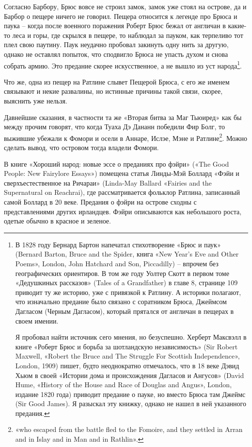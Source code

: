 Согласно Барбору, Брюс вовсе не строил замок, замок уже стоял на острове, да и Барбор о пещере ничего не говорил. Пещера относится к легенде про Брюса и паука – когда после военного поражения Роберт Брюс бежал от англичан в какие-то леса и горы, где скрылся в пещере, то наблюдал за пауком, как терпеливо тот плел свою паутину. Паук неудачно пробовал закинуть одну нить за другую, однако не оставлял попыток, что сподвигло Брюса не упасть духом и снова собрать армию. Это предание скорее искусственное, а не вышло из уст народа\footnote{В 1828 году Бернард Бартон напечатал стихотворение «Брюс и паук» (Bernard Barton, Bruce and the Spider, книга «New Year's Eve and Other Poems», London, John Hatchard and Son, Piccadilly) – впрочем без географических ориентиров. В том же году Уолтер Скотт в первом томе «Дедушкиных рассказов» (Tales of a Grandfather) в главе 8, странице 109 приводит ту же историю, уже с привязкой к Ратлину. А историки полагают, что изначально предание было связано с соратником Брюса, Джеймсом Дагласом (Черным Дагласом), который прятался от англичан в пещерах в своем имении. 

Я пробовал найти источник сего мнения, но безуспешно. Херберт Максвэлл в книге «Роберт Брюс и борьба за шотландскую независимость» (Sir Robert Maxwell, «Robert the Bruce and The Struggle For Scottish Independence», London, 1909) пишет, будто неоднократно отмечалось, что в 18 веке Дэвид Хьюм в своей «Истории дома и происхождения Дагласов и Ангусов» (David Hume, «History of the House and Race of Douglas and Angus», London, издание 1820 года) приводит предание о пауке, но вместо Брюса там Джеймс (Sir Good James). Я разыскал эту книжку, однако не нашел в ней указанного предания.}.  
 
Что же, одна из пещер на Ратлине слывет Пещерой Брюса, с его же именем связывают и некие развалины, но истинные причины такой связи, скорее, выяснить уже нельзя.

Давнейшие сказания, в частности та же «Вторая битва за Маг Тьюиред» как бы между прочим говорят, что когда Туаха Дэ Дананн победили Фир Болг, то выжившие убежали к Фомори и осели в Аннаре, Ислэе, Мэне и Ратлине\footnote{«who escaped from the battle fled to the Fomoire, and they settled in Arran and in Islay and in Man and in Rathlin».}. Можно сделать вывод, что островом тогда владели Фомори.

В книге «Хороший народ: новые эссе о преданиях про фэйри» («The Good People: New Fairylore Essays») помещена статья Линды-Мэй Боллард «Фэйи и сверхъестественное на Ричараи» (Linda-May Ballard «Fairies and the Supernatural on Reachrai), где рассматривается фольклор Ратлина, записанный самой Боллард в 20 веке. Предания о фэйри на острове сходны с представлениями других ирландцев. Фэйри описываются как небольшого роста, одетые обычно в красное и зеленое.


